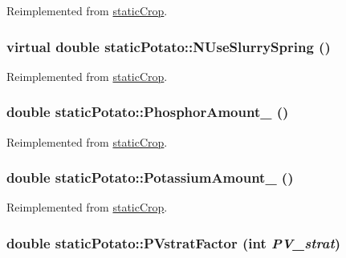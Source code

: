 Reimplemented from \hyperlink{classstatic_crop_a6b89d7839db435c7ceafa2755312182e}{staticCrop}.\hypertarget{classstatic_potato_aff8cbc0d6e8ffba511cc2ed8ca63dc6e}{
\subsubsection[{NUseSlurrySpring}]{\setlength{\rightskip}{0pt plus 5cm}virtual double staticPotato::NUseSlurrySpring ()}}
\label{classstatic_potato_aff8cbc0d6e8ffba511cc2ed8ca63dc6e}


Reimplemented from \hyperlink{classstatic_crop_ae7d21ab4afc8d8355d231566e8d87b1b}{staticCrop}.\hypertarget{classstatic_potato_a8b19a738a31bc248a422ea7f8b3246f2}{
\subsubsection[{PhosphorAmount\_\-}]{\setlength{\rightskip}{0pt plus 5cm}double staticPotato::PhosphorAmount\_\- ()}}
\label{classstatic_potato_a8b19a738a31bc248a422ea7f8b3246f2}


Reimplemented from \hyperlink{classstatic_crop_abaa5c59d4074d47dedc79172f8326e08}{staticCrop}.\hypertarget{classstatic_potato_a0eed9f043dcf8b89cb95e62b8bdd533b}{
\subsubsection[{PotassiumAmount\_\-}]{\setlength{\rightskip}{0pt plus 5cm}double staticPotato::PotassiumAmount\_\- ()}}
\label{classstatic_potato_a0eed9f043dcf8b89cb95e62b8bdd533b}


Reimplemented from \hyperlink{classstatic_crop_a41fee98d728c7670e6acb504a9b3459d}{staticCrop}.\hypertarget{classstatic_potato_a4ffc6382bc93ee2d70ca6007548d5501}{
\subsubsection[{PVstratFactor}]{\setlength{\rightskip}{0pt plus 5cm}double staticPotato::PVstratFactor (int {\em PV\_\-strat})}}
\label{classstatic_potato_a4ffc6382bc93ee2d70ca6007548d5501}


